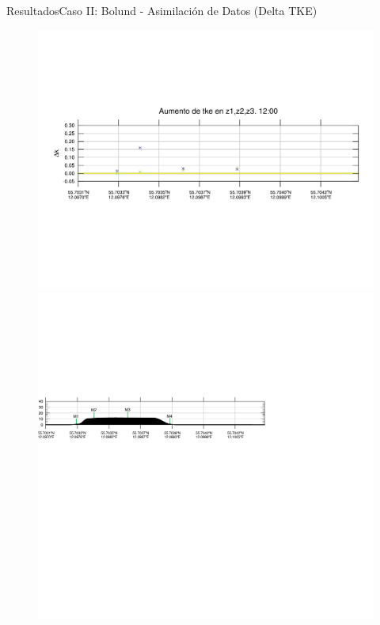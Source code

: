 \documentclass[mathserif,10pt]{beamer}
\begin{document}
\begin{frame}{Resultados}{Caso II: Bolund - Asimilación de Datos (Delta TKE)}
\begin{figure}[H]
		\includegraphics[width=0.65\linewidth,trim={12mm 84mm 10mm 74mm},page=37,clip]{fig/06/bol_da/delta_tke}\\%
		\includegraphics[width=0.65\linewidth,trim={-13.3mm 193mm 115mm 112mm},clip]{fig/06/bol/cross_height}\\%
		\label{fig:06_bol_da_tke}
	\end{figure}
\end{frame}
\end{document}
